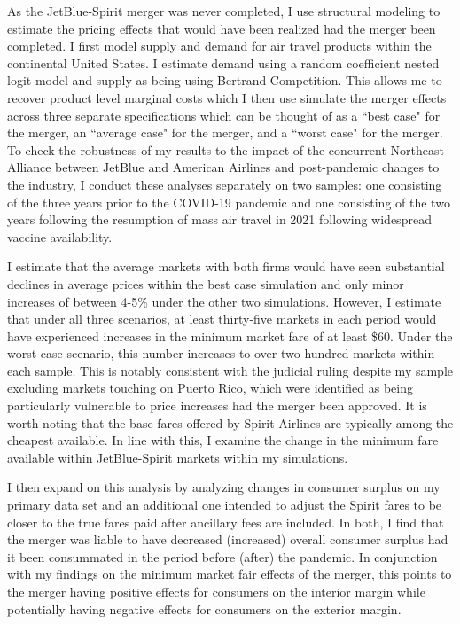 \documentclass{article}
\begin{document}

    As the JetBlue-Spirit merger was never completed, I  use structural modeling to estimate the pricing effects that would have been realized had the merger been completed. I first model supply and demand for air travel products within the continental United States. I estimate demand using a random coefficient nested logit model and supply as being using Bertrand Competition. This allows me to recover product level marginal costs which I then use simulate the merger effects across three separate specifications which can be thought of as a ``best case" for the merger, an ``average case" for the merger, and a ``worst case" for the merger. To check the robustness of my results to the impact of the concurrent Northeast Alliance between JetBlue and American Airlines and post-pandemic changes to the industry, I conduct these analyses separately on two samples: one consisting of the three years prior to the COVID-19 pandemic and one consisting of the two years following the resumption of mass air travel in 2021 following widespread vaccine availability. 

    I estimate that the average markets with both firms would have seen substantial declines in average prices within the best case simulation and only minor increases of between 4-5\% under the other two simulations. However, I estimate that under all three scenarios, at least thirty-five markets in each period would have experienced increases in the minimum market fare of at least \$60. Under the worst-case scenario, this number increases to over two hundred markets within each sample. This is notably consistent with the judicial ruling despite my sample excluding markets touching on Puerto Rico, which were identified as being particularly vulnerable to price increases had the merger been approved. It is worth noting that the base fares offered by Spirit Airlines are typically among the cheapest available. In line with this, I examine the change in the minimum fare available within JetBlue-Spirit markets within my simulations.

    I then expand on this analysis by analyzing changes in consumer surplus on my primary data set and an additional one intended to adjust the Spirit fares to be closer to the true fares paid after ancillary fees are included. In both, I find that the merger was liable to have decreased (increased) overall consumer surplus had it been consummated in the period before (after) the pandemic. In conjunction with my findings on the minimum market fair effects of the merger, this points to the merger having positive effects for consumers on the interior margin while potentially having negative effects for consumers on the exterior margin. 
\end{document}
